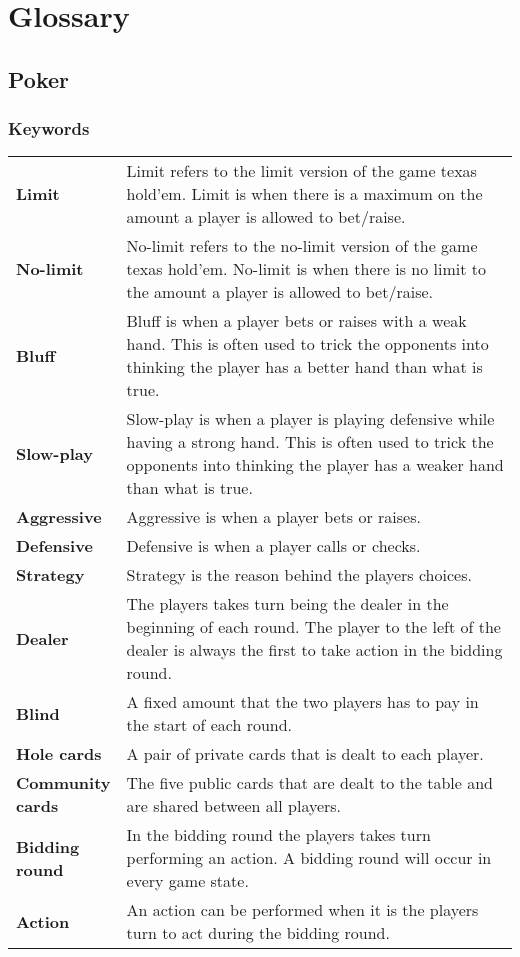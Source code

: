 \section*{Glossary}

\subsection*{Poker}
\subsubsection*{Keywords}
\begin{tabular}{ p{0.18\linewidth} p{0.82\linewidth} }
\textbf{Limit} & Limit refers to the limit version of the game texas hold'em. Limit is when there is a maximum on the amount a player is allowed to bet/raise.\\
\textbf{No-limit} & No-limit refers to the no-limit version of the game texas hold'em. No-limit is when there is no limit to the amount a player is allowed to bet/raise.\\
\textbf{Bluff} & Bluff is when a player bets or raises with a weak hand. This is often used to trick the opponents into thinking the player has a better hand than what is true.\\  
\textbf{Slow-play} & Slow-play is when a player is playing defensive while having a strong hand. This is often used to trick the opponents into thinking the player has a weaker hand than what is true.\\
\textbf{Aggressive} & Aggressive is when a player bets or raises.\\
\textbf{Defensive} & Defensive is when a player calls or checks.\\
\textbf{Strategy} & Strategy is the reason behind the players choices.\\
\textbf{Dealer} & The players takes turn being the dealer in the beginning of each round. The player to the left of the dealer is always the first to take action in the bidding round.\\
\textbf{Blind} & A fixed amount that the two players has to pay in the start of each round.\\
\textbf{Hole cards} & A pair of private cards that is dealt to each player. \\
\textbf{Community cards} & The five public cards that are dealt to the table and are shared between all players.\\
\textbf{Bidding round} & In the bidding round the players takes turn performing an action. A bidding round will occur in every game state.\\
\textbf{Action} & An action can be performed when it is the players turn to act during the bidding round.
\end{tabular}

